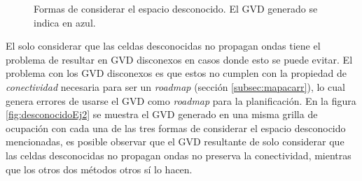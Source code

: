 \begin{figure}[H]
  \centerfloat

  \quad

  \caption[Formas de considerar el espacio desconocido.]{Formas de considerar el espacio desconocido. El GVD generado se indica en azul.}\label{fig:desconocidoEj1}
\end{figure}


El solo considerar que las celdas desconocidas no propagan ondas tiene el
problema de resultar en GVD disconexos en casos donde esto se puede evitar. El
problema con los GVD disconexos es que estos no cumplen con la propiedad de
\emph{conectividad} necesaria para ser un \emph{roadmap} (sección
\ref{subsec:mapacarr}), lo cual genera errores de usarse el GVD como
\emph{roadmap} para la planificación. En la figura \ref{fig:desconocidoEj2} se
muestra el GVD generado en una misma grilla de ocupación con cada una de las
tres formas de considerar el espacio desconocido mencionadas, es posible
observar que el GVD resultante de solo considerar que las celdas desconocidas
no propagan ondas no preserva la conectividad, mientras que los otros dos
métodos otros sí lo hacen.

